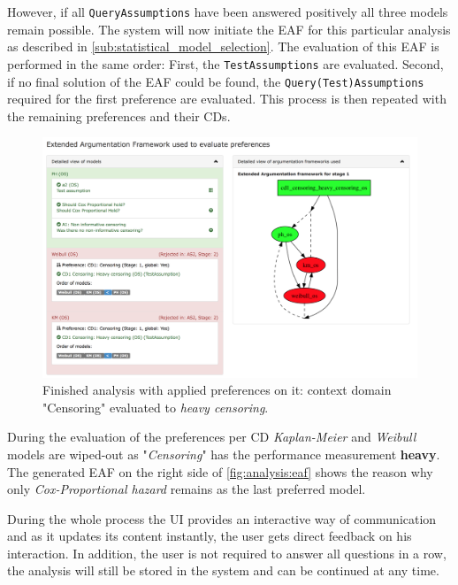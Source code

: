 However, if all \texttt{QueryAssumptions} have been answered positively all three models remain possible. The system will now initiate the \gls{EAF} for this particular analysis as described in \autoref{sub:statistical_model_selection}. The evaluation of this \gls{EAF} is performed in the same order: First, the \texttt{TestAssumptions} are evaluated. Second, if no final solution of the \gls{EAF} could be found, the \texttt{Query(Test)Assumptions} required for the first preference are evaluated. This process is then repeated with the remaining preferences and their \glspl{CD}.

\begin{figure}[t]
	\centering
	\includegraphics[width=\textwidth]{figures/ui_analysis_eaf}
	\caption{Finished analysis with applied preferences on it: context domain "Censoring" evaluated to \textit{heavy censoring}. }
	\label{fig:analysis:eaf}
\end{figure}


During the evaluation of the preferences per \gls{CD} \textit{Kaplan-Meier} and \textit{Weibull} models are wiped-out as "\textit{Censoring}" has the performance measurement \textbf{heavy}. The generated \gls{EAF} on the right side of \autoref{fig:analysis:eaf} shows the reason why only \textit{Cox-Proportional hazard} remains as the last preferred model.


During the whole process the \gls{UI} provides an interactive way of communication and as it updates its content instantly, the user gets direct feedback on his interaction. In addition, the user is not required to answer all questions in a row, the analysis will still be stored in the system and can be continued at any time. 